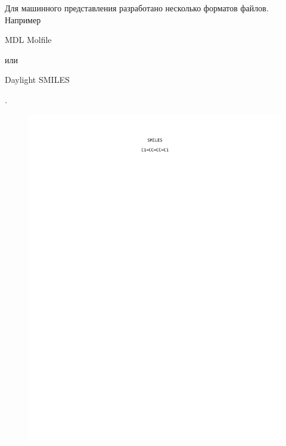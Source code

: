 \noindent Для машинного представления разработано несколько форматов файлов. Например \begin{tt}{MDL Molfile}\end{tt} или 
\begin{tt}Daylight SMILES\end{tt}.

\begin{figure}[h]
\centering
{\includegraphics[scale=0.8, clip, trim = 95mm 200mm 95mm 20mm]{img/benzene_smiles.pdf}}

\end{figure}
